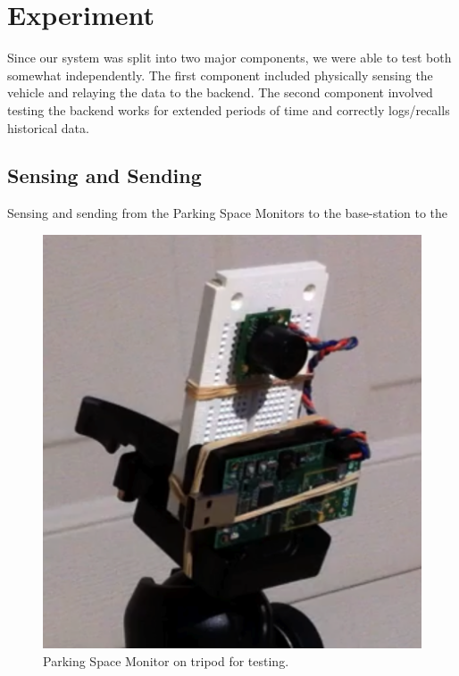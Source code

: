 \documentclass{acm_proc}
\begin{document}
\section{Experiment}\label{sec:experiment}

Since our system was split into two major components, we were able to test
both somewhat independently. 
The first component included physically sensing the vehicle and relaying
the data to the backend.
The second component involved testing the backend works for extended
periods of time and correctly logs/recalls historical data.

\subsection{Sensing and Sending}

Sensing and sending from the Parking Space Monitors to the base-station to the 

\begin{figure}[h]
    \begin{center}
		\includegraphics[width=\columnwidth]{figures/parking_sensor}
	\end{center}
	\caption{Parking Space Monitor on tripod for testing.}
	\label{fig:parking_sensor}
\end{figure}
\end{document}
